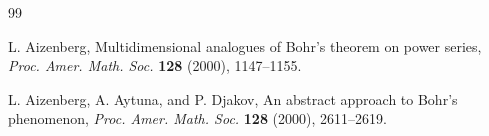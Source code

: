 \documentclass[a4paper,12pt]{amsart}
\theoremstyle{definition}
\begin{document}
\begin{thebibliography}{99}
	
	
	
	
	
	
	
	
	
	
	
	
	 {\sc L. Aizenberg}, Multidimensional analogues of Bohr's theorem on power series, \textit{Proc. Amer. Math. Soc.} {\bf 128} (2000), 1147--1155.
	
	 {\sc L. Aizenberg, A. Aytuna}, and {\sc P. Djakov}, An abstract approach to Bohr's phenomenon, {\it Proc. Amer. Math. Soc.} {\bf 128} (2000), 2611--2619.
	
	
	

\end{thebibliography}
\end{document}
